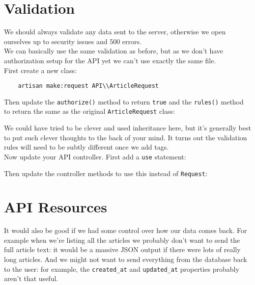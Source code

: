 \section{Validation}

We should always validate any data sent to the server, otherwise we open ourselves up to security issues and 500 errors.
\\

We can basically use the same validation as before, but as we don't have authorization setup for the API yet we can't use exactly the same file.
\\

First create a new class:

\begin{verbatim}
    artisan make:request API\\ArticleRequest
\end{verbatim}

Then update the \texttt{authorize()} method to return \texttt{true} and the \texttt{rules()} method to return the same as the original \texttt{ArticleRequest} class:


We could have tried to be clever and used inheritance here, but it's generally best to put such clever thoughts to the back of your mind. It turns out the validation rules will need to be subtly different once we add tags.
\\

Now update your API controller. First add a \texttt{use} statement:


Then update the controller methods to use this instead of \texttt{Request}:



\section{API Resources}

It would also be good if we had some control over how our data comes back. For example when we're listing all the articles we probably don't want to send the full article text: it would be a massive JSON output if there were lots of really long articles. And we might not want to send everything from the database back to the user: for example, the \texttt{created\_at} and \texttt{updated\_at} properties probably aren't that useful.
\\

